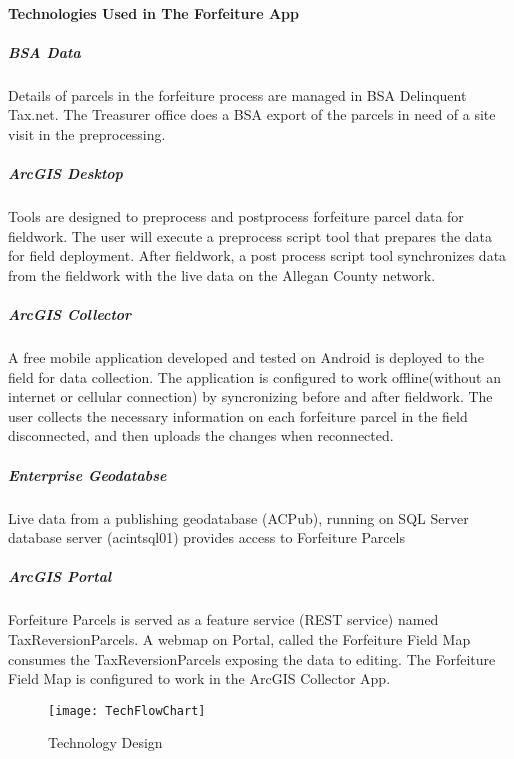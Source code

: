  \paragraph{Technologies Used in The Forfeiture App}
 \begin{adjmulticols}{2}{\innerMar}{\outerMar}
 \subparagraph{BSA Data}
 \noindent Details of parcels in the forfeiture process are managed in BSA Delinquent Tax.net.  The Treasurer office does a BSA export of the parcels in need of a site visit in the preprocessing.
 \subparagraph{ArcGIS Desktop}\noindent Tools are designed to preprocess and postprocess forfeiture parcel data for fieldwork.  The user will execute a preprocess script tool that prepares the data for field deployment.  After fieldwork, a post process script tool synchronizes data from the fieldwork with the live data on the Allegan County network.
 \subparagraph{ArcGIS Collector}\noindent A free mobile application developed and tested on Android is deployed to the field for data collection.  The application is configured to work offline(without an internet or cellular connection) by syncronizing before and after fieldwork. The user collects the necessary information on each forfeiture parcel in the field disconnected, and then uploads the changes when reconnected.
 \subparagraph{Enterprise Geodatabse}\noindent Live data from a publishing geodatabase (ACPub), running on SQL Server database server (acintsql01) provides access to Forfeiture Parcels
 \subparagraph{ArcGIS Portal} \noindent Forfeiture Parcels is served as a feature service (REST service)  named TaxReversionParcels.  A webmap on Portal, called the Forfeiture Field Map consumes the TaxReversionParcels exposing the data to editing.  The Forfeiture Field Map is configured to work in the ArcGIS Collector App.
 \end{adjmulticols}
 \begin{figure}[H]
 \centering
     \texttt{[image: TechFlowChart]}
 \vspace{-.25in}

 \caption{Technology Design}
 \end{figure}
 \clearpage
